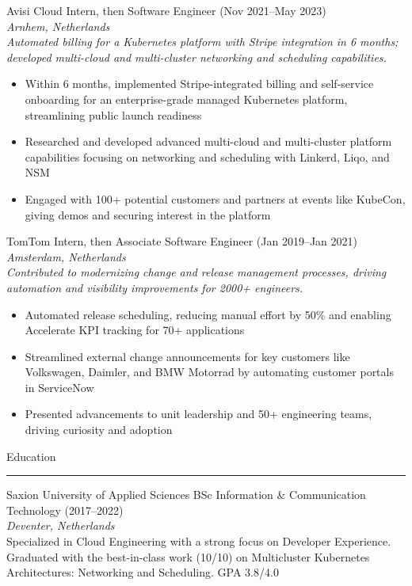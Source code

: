 \documentclass[10pt,a4paper]{article}
\newcommand{\CVSection}[1]{%
  \vspace{8pt}%
  {\headingfont\textcolor{techBlue}{#1}}\\
  \rule{\linewidth}{0.5pt}%
  \vspace{4pt}%
}
\begin{document}
{\headingfont Avisi Cloud \hfill Intern, then Software Engineer (Nov 2021--May 2023)} \\
\textit{Arnhem, Netherlands} \\
\textit{Automated billing for a Kubernetes platform with Stripe integration in 6 months; developed multi-cloud and multi-cluster networking and scheduling capabilities.}
\begin{itemize}[leftmargin=*]
  \item Within 6 months, implemented Stripe-integrated billing and self-service onboarding for an enterprise-grade managed Kubernetes platform, streamlining public launch readiness
  \item Researched and developed advanced multi-cloud and multi-cluster platform capabilities focusing on networking and scheduling with Linkerd, Liqo, and NSM
  \item Engaged with 100+ potential customers and partners at events like KubeCon, giving demos and securing interest in the platform
\end{itemize}

{\headingfont TomTom \hfill Intern, then Associate Software Engineer (Jan 2019--Jan 2021)} \\
\textit{Amsterdam, Netherlands} \\
\textit{Contributed to modernizing change and release management processes, driving automation and visibility improvements for 2000+ engineers.}
\begin{itemize}[leftmargin=*]
  \item Automated release scheduling, reducing manual effort by 50\% and enabling Accelerate KPI tracking for 70+ applications
  \item Streamlined external change announcements for key customers like Volkswagen, Daimler, and BMW Motorrad by automating customer portals in ServiceNow
  \item Presented advancements to unit leadership and 50+ engineering teams, driving curiosity and adoption
\end{itemize}

\CVSection{Education}
{\headingfont Saxion University of Applied Sciences \hfill BSc Information \& Communication Technology (2017--2022)} \\
\textit{Deventer, Netherlands} \\
Specialized in Cloud Engineering with a strong focus on Developer Experience. Graduated with the best-in-class work (10/10) on Multicluster Kubernetes Architectures: Networking and Scheduling. GPA 3.8/4.0
\end{document}
